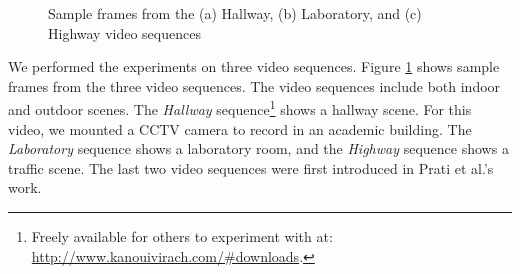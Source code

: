 \begin{figure}[t]
  \centering
  \hspace{0.05cm}
  \hspace{0.05cm}
  \caption[Sample frames from the Hallway, Laboratory, and Highway
    video sequences.]{\small Sample frames from the (a) Hallway, (b)
    Laboratory, and (c) Highway video sequences}
  \label{fig:benchmark}
\end{figure}

We performed the experiments on three video sequences.
Figure \ref{fig:benchmark} shows sample frames from the three video
sequences. The video sequences include both indoor and outdoor
scenes. The \textit{Hallway} sequence\footnote{Freely available for
others to experiment with
at: \url{http://www.kanouivirach.com/#downloads}.} shows a hallway
scene. For this video, we mounted a CCTV camera to record in an
academic building. The \textit{Laboratory} sequence shows a laboratory
room, and the \textit{Highway} sequence shows a traffic scene. The
last two video sequences were first introduced in Prati et al.'s
work\nocite{prati03shadow}.

